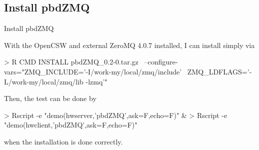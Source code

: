 \subsection{Install pbdZMQ}{Install pbdZMQ}
\label{sec:install_pbdzmq}
With the OpenCSW and external ZeroMQ 4.0.7 installed, I can install
 simply via
\begin{Code}
> R CMD INSTALL pbdZMQ_0.2-0.tar.gz \
  --configure-vars="ZMQ_INCLUDE='-I/work-my/local/zmq/include' \
                    ZMQ_LDFLAGS='-L/work-my/local/zmq/lib -lzmq'"
\end{Code}
Then, the test can be done by
\begin{Code}
> Rscript -e "demo(hwserver,'pbdZMQ',ask=F,echo=F)" &
> Rscript -e "demo(hwclient,'pbdZMQ',ask=F,echo=F)"
\end{Code}
when the  installation is done correctly.

